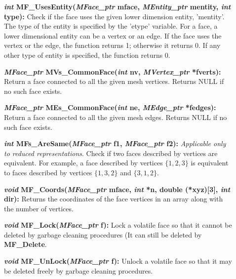 \documentclass[12pt]{article}
\begin{document}
\begin{description}
\item[]

\item[]{\bf {\em int} MF\_UsesEntity({\em MFace\_ptr} mface,
{\em MEntity\_ptr} mentity, {\em int} type):} Check if the face
uses the given lower dimension entity, 'mentity'. The type of the
entity is specified by the 'etype' variable. For a face, a lower
dimensional entity can be a vertex or an edge. If the face uses the
vertex or the edge, the function returns 1; otherwise it returns 0. If
any other type of entity is specified, the function returns 0.

\item[]{\bf {\em MFace\_ptr} MVs\_CommonFace({\em int} nv,
    {\em MVertex\_ptr} *fverts):} Return a face connected to all
  the given mesh vertices. Returns NULL if no such face exists.

\item[]{\bf {\em MFace\_ptr} MEs\_CommonFace({\em int} ne,
    {\em MEdge\_ptr} *fedges):} Return a face connected to all
  the given mesh edges. Returns NULL if no such face exists.

\item[]{\bf {\em int} MFs\_AreSame({\em MFace\_ptr} f1, {\em
      MFace\_ptr} f2):} {\em Applicable only to reduced
    representations}. Check if two faces described by vertices are
  equivalent. For example, a face described by vertices $\{1,2,3\}$ is
  equivalent to faces described by vertices $\{1,3,2\}$ and
  $\{3,1,2\}$.

\item[]

\item[]{\bf {\em void} MF\_Coords({\em MFace\_ptr} mface,
{\em int} *n, double (*xyz)[3], {\em int} dir):} Returns the
coordinates of the face vertices in an array along with the number of
vertices. 

\item[]

\item[]{\bf {\em void} MF\_Lock({\em MFace\_ptr} f):} Lock a volatile
  face so that it cannot be deleted by garbage cleaning procedures (It
  can still be deleted by {\bf MF\_Delete}.

\item[]{\bf {\em void} MF\_UnLock({\em MFace\_ptr} f):} Unlock a volatile
  face so that it may be deleted freely by garbage cleaning procedures.

\end{description}
\end{document}
